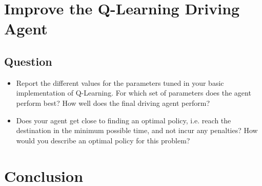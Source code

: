 \documentclass[twoside,openright,titlepage,numbers=noenddot,headinclude,%
               footinclude=true,cleardoublepage=empty,abstractoff,BCOR=5mm,%
               paper=a4,fontsize=11pt,ngerman,american]{scrreprt}
\numberwithin{theorem}{chapter}
\numberwithin{definition}{chapter}
\numberwithin{algorithm}{chapter}
\numberwithin{figure}{chapter}
\numberwithin{table}{chapter}
\numberwithin{equation}{chapter}
\begin{document}
\chapter*{Improve the Q-Learning Driving Agent}

\section*{Question}

\begin{itemize}
\item Report the different values for the parameters tuned in your basic implementation of Q-Learning. For which set of parameters does the agent perform best? How well does the final driving agent perform?
\item Does your agent get close to finding an optimal policy, i.e. reach the destination in the minimum possible time, and not incur any penalties? How would you describe an optimal policy for this problem?

\end{itemize}

%
%

\chapter*{Conclusion}
\end{document}
